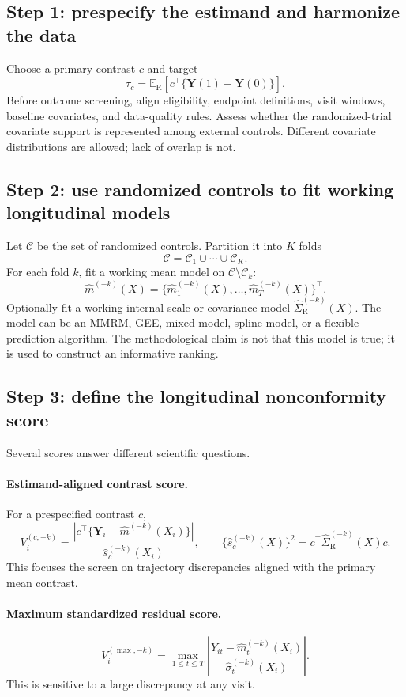 \documentclass[11pt]{article}
\newcommand{\R}{\mathrm{R}}
\newcommand{\Exp}{\mathbb{E}}
\begin{document}
\subsection{Step 1: prespecify the estimand and harmonize the data}

Choose a primary contrast $c$ and target
\[
\tau_c=\Exp_{\R}\!\left[c^{\top}\{\bm Y(1)-\bm Y(0)\}\right].
\]
Before outcome screening, align eligibility, endpoint definitions, visit windows, baseline covariates, and data-quality rules. Assess whether the randomized-trial covariate support is represented among external controls. Different covariate distributions are allowed; lack of overlap is not.

\subsection{Step 2: use randomized controls to fit working longitudinal models}

Let $\mathcal C$ be the set of randomized controls. Partition it into $K$ folds
\[
\mathcal C=\mathcal C_1\cup\cdots\cup\mathcal C_K.
\]
For each fold $k$, fit a working mean model on $\mathcal C\setminus\mathcal C_k$:
\[
\widehat m^{(-k)}(X)
=
\{\widehat m^{(-k)}_1(X),\ldots,\widehat m^{(-k)}_T(X)\}^{\top}.
\]
Optionally fit a working internal scale or covariance model $\widehat\Sigma_{\R}^{(-k)}(X)$. The model can be an MMRM, GEE, mixed model, spline model, or a flexible prediction algorithm. The methodological claim is not that this model is true; it is used to construct an informative ranking.

\subsection{Step 3: define the longitudinal nonconformity score}

Several scores answer different scientific questions.

\paragraph{Estimand-aligned contrast score.}
For a prespecified contrast $c$,
\[
V_i^{(c,-k)}
=
\frac{\left|c^{\top}\{\bm Y_i-\widehat m^{(-k)}(X_i)\}\right|}
{\widehat s_c^{(-k)}(X_i)},
\qquad
\{\widehat s_c^{(-k)}(X)\}^2
=c^{\top}\widehat\Sigma_{\R}^{(-k)}(X)c.
\tag{3}
\]
This focuses the screen on trajectory discrepancies aligned with the primary mean contrast.

\paragraph{Maximum standardized residual score.}
\[
V_i^{(\max,-k)}
=
\max_{1\le t\le T}
\left|
\frac{Y_{it}-\widehat m_t^{(-k)}(X_i)}
{\widehat\sigma_t^{(-k)}(X_i)}
\right|.
\tag{4}
\]
This is sensitive to a large discrepancy at any visit.
\end{document}
